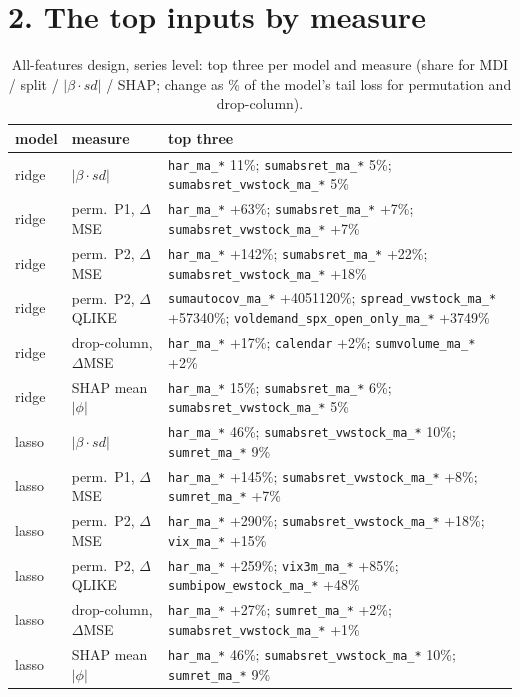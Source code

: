 \documentclass[10pt]{article}
\begin{document}
\section*{2. The top inputs by measure}
\begin{table}[H]\centering\scriptsize
\caption{All-features design, series level: top three per model and measure (share for MDI / split / $|\beta\cdot sd|$ / SHAP; change as \% of the model's tail loss for permutation and drop-column).}
\begin{tabular}{llp{11.2cm}}\toprule
model & measure & top three\\\midrule
ridge & $|\beta\cdot sd|$ & \texttt{har\_ma\_*} 11\%; \texttt{sumabsret\_ma\_*} 5\%; \texttt{sumabsret\_vwstock\_ma\_*} 5\% \\
ridge & perm.\ P1, $\Delta$MSE & \texttt{har\_ma\_*} +63\%; \texttt{sumabsret\_ma\_*} +7\%; \texttt{sumabsret\_vwstock\_ma\_*} +7\% \\
ridge & perm.\ P2, $\Delta$MSE & \texttt{har\_ma\_*} +142\%; \texttt{sumabsret\_ma\_*} +22\%; \texttt{sumabsret\_vwstock\_ma\_*} +18\% \\
ridge & perm.\ P2, $\Delta$QLIKE & \texttt{sumautocov\_ma\_*} +4051120\%; \texttt{spread\_vwstock\_ma\_*} +57340\%; \texttt{voldemand\_spx\_open\_only\_ma\_*} +3749\% \\
ridge & drop-column, $\Delta$MSE & \texttt{har\_ma\_*} +17\%; \texttt{calendar} +2\%; \texttt{sumvolume\_ma\_*} +2\% \\
ridge & SHAP mean $|\phi|$ & \texttt{har\_ma\_*} 15\%; \texttt{sumabsret\_ma\_*} 6\%; \texttt{sumabsret\_vwstock\_ma\_*} 5\% \\
lasso & $|\beta\cdot sd|$ & \texttt{har\_ma\_*} 46\%; \texttt{sumabsret\_vwstock\_ma\_*} 10\%; \texttt{sumret\_ma\_*} 9\% \\
lasso & perm.\ P1, $\Delta$MSE & \texttt{har\_ma\_*} +145\%; \texttt{sumabsret\_vwstock\_ma\_*} +8\%; \texttt{sumret\_ma\_*} +7\% \\
lasso & perm.\ P2, $\Delta$MSE & \texttt{har\_ma\_*} +290\%; \texttt{sumabsret\_vwstock\_ma\_*} +18\%; \texttt{vix\_ma\_*} +15\% \\
lasso & perm.\ P2, $\Delta$QLIKE & \texttt{har\_ma\_*} +259\%; \texttt{vix3m\_ma\_*} +85\%; \texttt{sumbipow\_ewstock\_ma\_*} +48\% \\
lasso & drop-column, $\Delta$MSE & \texttt{har\_ma\_*} +27\%; \texttt{sumret\_ma\_*} +2\%; \texttt{sumabsret\_vwstock\_ma\_*} +1\% \\
lasso & SHAP mean $|\phi|$ & \texttt{har\_ma\_*} 46\%; \texttt{sumabsret\_vwstock\_ma\_*} 10\%; \texttt{sumret\_ma\_*} 9\% \\

\end{tabular}
\end{table}
\end{document}
